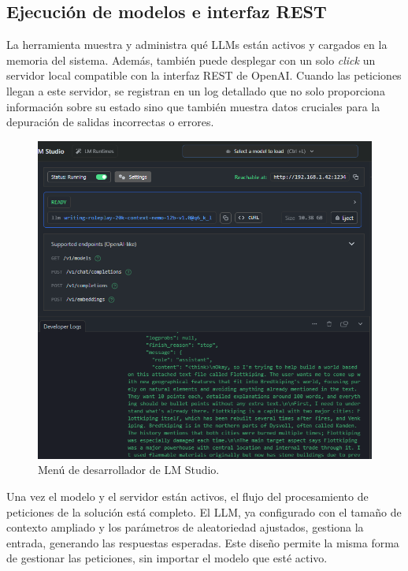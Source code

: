 \pagebreak
\subsection{Ejecución de modelos e interfaz REST}
La herramienta muestra y administra qué LLMs están activos y cargados en la memoria del sistema.
Además, también puede desplegar con un solo \textit{click} un servidor local compatible con la interfaz REST de OpenAI.
Cuando las peticiones llegan a este servidor, se registran en un log detallado que no solo proporciona
información sobre su estado sino que también muestra datos cruciales para la depuración de salidas incorrectas o errores.

\begin{figure}[htbp]
	\centering
	\includegraphics[width=1.0 \textwidth]{./Figures/developer_menu.png}
	\caption{Menú de desarrollador de LM Studio.}
	\label{fig:developerMenu}
\end{figure}

Una vez el modelo y el servidor están activos, el flujo del procesamiento de peticiones de la solución está completo.
El LLM, ya configurado con el tamaño de contexto ampliado y los parámetros de aleatoriedad ajustados,
gestiona la entrada, generando las respuestas esperadas.
Este diseño permite la misma forma de gestionar las peticiones,
sin importar el modelo que esté activo.

\pagebreak
